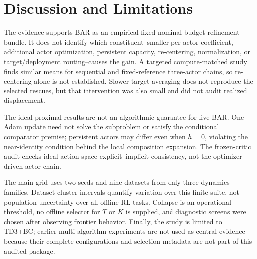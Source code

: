 \section{Discussion and Limitations}
\label{sec:discussion}

The evidence supports BAR as an empirical fixed-nominal-budget refinement bundle. It does not identify which constituent--smaller per-actor coefficient, additional actor optimization, persistent capacity, re-centering, normalization, or target/deployment routing--causes the gain. A targeted compute-matched study finds similar means for sequential and fixed-reference three-actor chains, so re-centering alone is not established. Slower target averaging does not reproduce the selected rescues, but that intervention was also small and did not audit realized displacement.

The ideal proximal results are not an algorithmic guarantee for live BAR. One Adam update need not solve the subproblem or satisfy the conditional comparator premise; persistent actors may differ even when $h=0$, violating the near-identity condition behind the local composition expansion. The frozen-critic audit checks ideal action-space explicit--implicit consistency, not the optimizer-driven actor chain.

The main grid uses two seeds and nine datasets from only three dynamics families. Dataset-cluster intervals quantify variation over this finite suite, not population uncertainty over all offline-RL tasks. Collapse is an operational threshold, no offline selector for $T$ or $K$ is supplied, and diagnostic screens were chosen after observing frontier behavior. Finally, the study is limited to TD3+BC; earlier multi-algorithm experiments are not used as central evidence because their complete configurations and selection metadata are not part of this audited package.
